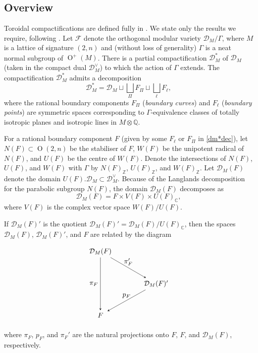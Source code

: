 \documentclass[11pt]{amsart}
\newcommand{\CC}{\mathbb{C}}
\newcommand{\ZZ}{\mathbb{Z}}
\newcommand{\QQ}{\mathbb{Q}}
\newcommand{\dc}{\mathcal{D}}
\newcommand{\opn}{\operatorname}
\newcommand{\fc}{\mathcal{F}}
\begin{document}
\subsection{Overview}
Toroidal compactifications are defined fully in \cite{AMRT}.
We state only the results we require, following  \cite{Handbook}.
Let $\fc$ denote the orthogonal modular variety $\dc_M/\Gamma$, where $M$ is a lattice of signature $(2, n)$ and (without loss of generality) $\Gamma$ is a neat normal subgroup of $\opn{O}^+(M)$.
There is a partial compactification $\dc_M^*$ of $\dc_M$ (taken in the compact dual $\dc_M^{\vee}$) to which the action of $\Gamma$ extends.
The compactification $\dc_M^*$ admits a decomposition  
\begin{equation}\label{dm*dec}
\dc_M^* = \dc_M \sqcup \bigsqcup_{\Pi} F_{\Pi} \sqcup \bigsqcup_{\ell} F_{\ell},
\end{equation}
where the rational boundary components $F_{\Pi}$ (\emph{boundary curves}) and $F_{\ell}$ (\emph{boundary points}) are symmetric spaces corresponding to $\Gamma$-equivalence classes of totally isotropic planes and isotropic lines in $M \otimes \QQ$. 

For a rational boundary component $F$ (given by some $F_{\ell}$ or $F_{\Pi}$ in \eqref{dm*dec}), let $N(F) \subset \opn{O}(2, n)$ be the stabiliser of $F$, $W(F)$ be the unipotent radical of $N(F)$, and $U(F)$ be the centre of $W(F)$.
Denote the intersections of $N(F)$, $U(F)$, and $W(F)$ with $\Gamma$ by $N(F)_{\ZZ}$, $U(F)_{\ZZ}$, and $W(F)_{\ZZ}$.
Let $\dc_M(F)$ denote the domain $U(F). \dc_M \subset \dc_M^{\vee}$.
Because of the Langlands decomposition for the parabolic subgroup $N(F)$, the domain $\dc_M(F)$ decomposes as  
\begin{equation*}
\dc_M(F) = F \times V(F) \times U(F)_{\CC},
\end{equation*}
where $V(F)$ is the complex vector space $W(F)/U(F)$.

If $\dc_M(F)'$ is the quotient $\dc_M(F)'=\dc_M(F)/U(F)_{\CC}$, then the spaces $\dc_M(F)$, $\dc_M(F)'$, and $F$ are related by the diagram
\begin{equation*}
\begin{tikzpicture}
\matrix (m) [matrix of math nodes,row sep=3em,column sep=4em,minimum width=2em]
{
\mathcal{D}_M(F) & \\
& \mathcal{D}_M(F)'\\
F & \\
};
\path[-stealth]
(m-1-1) edge node [above] {$\pi_F'$}  (m-2-2) 
(m-2-2) edge node [above] {$p_F$} (m-3-1)
(m-1-1) edge node [left] {$\pi_F$} (m-3-1)
;
\end{tikzpicture}
\end{equation*}  
where $\pi_F$, $p_F$, and $\pi_F'$ are the natural projections onto $F$, $F$, and $\dc_M(F)$, respectively. 
\end{document}
